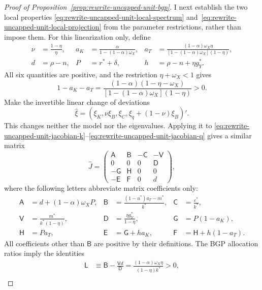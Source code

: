 \begin{proof}[Proof of Proposition~\ref{prop:rewrite-uncapped-unit-bgp}]
I next establish the two local properties
\eqref{eq:rewrite-uncapped-unit-local-spectrum}
and~\eqref{eq:rewrite-uncapped-unit-local-projection} from the parameter
restrictions, rather than impose them. For this linearization only, define
\begin{align*}
 \nu&=\frac{1-\eta}{\eta},&
 a_K&=\frac{\alpha}{1-(1-\alpha)\omega_X},&
 a_T&=\frac{(1-\alpha)\omega_X\eta}
 {[1-(1-\alpha)\omega_X](1-\eta)},\\
 d&=\rho-n,&P&=r^*+\delta,&h&=\rho-n+\eta g_Y^*.
\end{align*}
All six quantities are positive, and the restriction $\eta+\omega_X<1$ gives
\begin{equation}
 1-a_K-a_T
 =\frac{(1-\alpha)(1-\eta-\omega_X)}
 {[1-(1-\alpha)\omega_X](1-\eta)}>0.
 \label{eq:rewrite-uncapped-unit-local-gap}
\end{equation}
Make the invertible linear change of deviations
\[
 \widehat\xi=(\xi_K,\nu\xi_B,\xi_C,\xi_q+(1-\nu)\xi_B)'.
\]
This changes neither the model nor the eigenvalues. Applying it to
\eqref{eq:rewrite-uncapped-unit-jacobian-k}--\eqref{eq:rewrite-uncapped-unit-jacobian-q}
gives a similar matrix
\begin{equation}
 \widehat J=
 \begin{pmatrix}
  \mathsf A&\mathsf B&-\mathsf C&-\mathsf V\\
  0&0&0&\mathsf D\\
  -\mathsf G&\mathsf H&0&0\\
  -\mathsf E&\mathsf F&0&d
 \end{pmatrix},
 \label{eq:rewrite-uncapped-unit-local-similarity}
\end{equation}
where the following letters abbreviate matrix coefficients only:
\begin{align*}
 \mathsf A&=d+(1-\alpha)\omega_X P,&
 \mathsf B&=\frac{(1-u^*)a_T-m^*}{k^*},&
 \mathsf C&=\frac{c^*}{k^*},\\
 \mathsf V&=\frac{m^*}{k^*(1-\eta)},&
 \mathsf D&=\frac{\eta g_Y^*}{1-\eta},&
 \mathsf G&=P(1-a_K),\\
 \mathsf H&=Pa_T,&
 \mathsf E&=\mathsf G+ha_K,&
 \mathsf F&=\mathsf H+h(1-a_T).
\end{align*}
All coefficients other than $\mathsf B$ are positive by their definitions.
The BGP allocation
ratios imply the identities
\begin{align}
 \mathsf L&\equiv\mathsf B-\frac{\mathsf Vd}{\mathsf D}
 =\frac{(1-\alpha)\omega_X\eta}{(1-\eta)k^*}>0,
 \label{eq:rewrite-uncapped-unit-local-l}\\

\end{align}
\end{proof}
